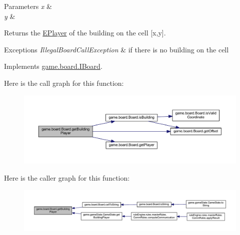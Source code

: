 \begin{DoxyParams}{Parameters}
{\em x} & \\
\hline
{\em y} & \\
\hline
\end{DoxyParams}
\begin{DoxyReturn}{Returns}
the \mbox{\hyperlink{enumgame_1_1_e_player}{E\+Player}} of the building on the cell \mbox{[}x,y\mbox{]}. 
\end{DoxyReturn}

\begin{DoxyExceptions}{Exceptions}
{\em Illegal\+Board\+Call\+Exception} & if there is no building on the cell \\
\hline
\end{DoxyExceptions}


Implements \mbox{\hyperlink{interfacegame_1_1board_1_1_i_board_a3be0f107436cd176949e9a94a90f7134}{game.\+board.\+I\+Board}}.

Here is the call graph for this function\+:
\nopagebreak
\begin{figure}[H]
\begin{center}
\leavevmode
\includegraphics[width=350pt]{classgame_1_1board_1_1_board_a26945d3e21a7033fa9d6b26d61425fe2_cgraph}
\end{center}
\end{figure}
Here is the caller graph for this function\+:
\nopagebreak
\begin{figure}[H]
\begin{center}
\leavevmode
\includegraphics[width=350pt]{classgame_1_1board_1_1_board_a26945d3e21a7033fa9d6b26d61425fe2_icgraph}
\end{center}
\end{figure}
\mbox{\label{classgame_1_1board_1_1_board_ab5376949c9c2ee4fa825e3df27f798ed}} 
